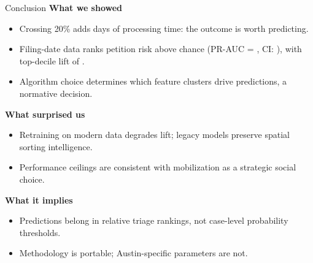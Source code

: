 \documentclass[10pt, aspectratio=169]{beamer}
\begin{document}
\begin{frame}{Conclusion}
 \small
 \textbf{What we showed}
 \begin{itemize}
 \item Crossing 20\% adds \metricRDDelay{} days of processing time: the outcome is worth predicting.
 \item Filing-date data ranks petition risk above chance (PR-AUC = \metricBootstrapFiling{}, CI: \metricBootstrapFilingCI{}), with top-decile lift of \metricTopDecileLift{}.
 \item Algorithm choice determines which feature clusters drive predictions, a normative decision.
 \end{itemize}

 \textbf{What surprised us}
 \begin{itemize}
 \item Retraining on modern data degrades lift; legacy models preserve spatial sorting intelligence.
 \item Performance ceilings are consistent with mobilization as a strategic social choice.
 \end{itemize}

 \textbf{What it implies}
 \begin{itemize}
 \item Predictions belong in relative triage rankings, not case-level probability thresholds.
 \item Methodology is portable; Austin-specific parameters are not.
 \end{itemize}
\end{frame}
\end{document}
